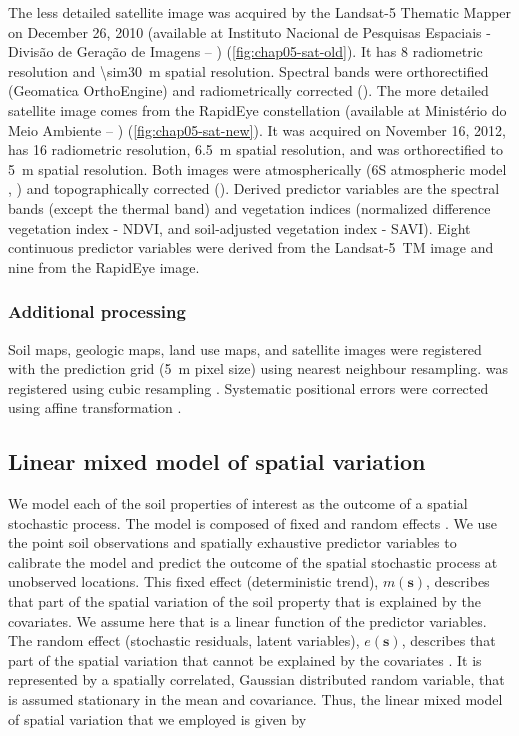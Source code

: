 The less detailed satellite image was acquired by the Landsat-\num{5} Thematic Mapper on December \num{26}, 
\num{2010} (available at Instituto Nacional de Pesquisas Espaciais - Divisão de Geração de Imagens -- 
\inpedgi) 
(\autoref{fig:chap05-sat-old}). It has \SI{8}{\bit} radiometric resolution and \SI{\sim30}{\m} spatial 
resolution. Spectral bands were orthorectified (Geomatica OrthoEngine) and radiometrically corrected 
(). The more detailed satellite image comes from the RapidEye constellation (available 
at 
Ministério do Meio Ambiente -- \mma) (\autoref{fig:chap05-sat-new}). It was acquired on November \num{16}, 
\num{2012}, has \SI{16}{\bit} radiometric resolution, \SI{6.5}{\m} spatial resolution, and was orthorectified 
to \SI{5}{\m} spatial resolution. Both images were atmospherically (6S atmospheric model 
\cite{VermoteEtAl1997}, ) and topographically corrected (). Derived 
predictor variables are the spectral bands (except the thermal band) and vegetation indices (normalized 
difference vegetation index - NDVI, and soil-adjusted vegetation index - SAVI). Eight continuous predictor 
variables were derived from the Landsat-5~TM image and nine from the RapidEye image.

\subsubsection*{Additional processing}
\label{subsubsec:chap05-sources-processing}

Soil maps, geologic maps, land use maps, and satellite images were registered with the prediction grid 
(\SI{5}{\m} pixel size) using nearest neighbour resampling. \demOld{} was registered using cubic resampling 
\cite{Samuel-RosaEtAl2013c}. Systematic positional errors were corrected using affine transformation 
\cite{Samuel-RosaEtAl2014}.

\subsection{Linear mixed model of spatial variation}
\label{subsec:chap05-lmm}

We model each of the soil properties of interest as the outcome of a spatial stochastic process. The model is 
composed of fixed and random effects \cite{HeuvelinkEtAl2001, LarkEtAl2006}. We use the point soil 
observations and spatially exhaustive predictor variables to calibrate the model and predict the outcome of 
the 
spatial stochastic process at unobserved locations. This fixed effect (deterministic trend), $m(\textbf{s})$, 
describes that part of the spatial variation of the soil property that is explained by the covariates. We 
assume here that is a linear function of the predictor variables. The random effect (stochastic residuals, 
latent variables), $e(\textbf{s})$, describes that part of the spatial variation that cannot be 
explained by the covariates \cite{Cressie1993}. It is represented by a spatially correlated, Gaussian 
distributed random variable, that is assumed stationary in the mean and covariance. Thus, the linear mixed 
model of spatial variation that we employed is given by

